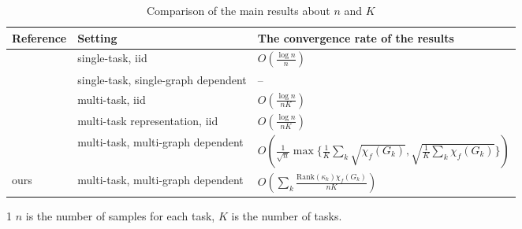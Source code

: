 \documentclass{article}
\begin{document}
\begin{table}[t]
\caption{Comparison of the main results about $n$ and $K$ } 
\label{table: full_discuss_nk}
\begin{center}
\begin{small}
\begin{threeparttable} 
\begin{tabular}{lll}
\toprule
Reference  & Setting & The convergence rate of the results 
\\
\midrule
 \cite{Bartlett_2005} &  single-task, iid & $O(\frac{\log n}{n})$  \\
 \cite{ralaivola2015entropy} & single-task,  single-graph dependent  & --   \\
 \cite{yousefi18} & multi-task, iid & $O(\frac{\log n}{n K})$  \\
 \cite{watkins2023optimistic} & multi-task representation, iid & $O(\frac{\log n}{n K})$  \\
 \cite{wu2023macro-auc} & multi-task, multi-graph dependent & $O(\frac{1}{\sqrt{n}} \max\{\frac{1}{K} \sum_k \sqrt{\chi_f(G_k)}, \sqrt{\frac{1}{K} \sum_k \chi_f(G_k)} \})$  \\
 ours & multi-task, multi-graph dependent & $O(\sum_k \frac{\mathrm{Rank}(\kappa_k) \chi_f(G_k)}{n K})$ \\
\bottomrule
\end{tabular}
\begin{tablenotes}
    \footnotesize
    \item[1] $n$ is the number of samples for each task, $K$ is the number of tasks. 
   
\end{tablenotes}
\end{threeparttable}
\end{small}
\end{center}
\end{table}
\end{document}
